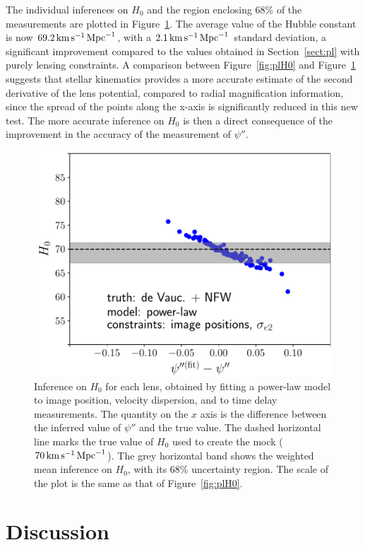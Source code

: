 \documentclass[usenatbib]{mnras}
\def\psiii{\psi''}
\def\Hunit{\,\rm{km}\,{s}^{-1}\,\rm{Mpc}^{-1}}
\def\Sref#1{Section~\ref{#1}\xspace}
\def\Fref#1{Figure~\ref{#1}\xspace}
\begin{document}
The individual inferences on $H_0$ and the region enclosing 68\% of the measurements are plotted in \Fref{fig:pl_indH0_wdyn}.
The average value of the Hubble constant is now $69.2\Hunit$, with a $2.1\Hunit$ standard deviation, a significant improvement compared to the values obtained in \Sref{sect:pl} with purely lensing constraints.
A comparison between \Fref{fig:plH0} and \Fref{fig:pl_indH0_wdyn} suggests that stellar kinematics provides a more accurate estimate of the second derivative of the lens potential, compared to radial magnification information, since the spread of the points along the x-axis is significantly reduced in this new test.
The more accurate inference on $H_0$ is then a direct consequence of the improvement in the accuracy of the measurement of $\psiii$.
%
\begin{figure}
 \includegraphics[width=\columnwidth]{pl_impos_dyn_individual_H0.pdf}
 \caption{Inference on $H_0$ for each lens, obtained by fitting a power-law model to image position, velocity dispersion, and to time delay measurements.
The quantity on the $x$ axis is the difference between the inferred value of $\psiii$ and the true value. The dashed horizontal line marks the true value of $H_0$ used to create the mock ($70\,\rm{km}\,\rm{s}^{-1}\,\rm{Mpc}^{-1}$).
The grey horizontal band shows the weighted mean inference on $H_0$, with its 68\% uncertainty region.
The scale of the plot is the same as that of \Fref{fig:plH0}.}
 \label{fig:pl_indH0_wdyn}
\end{figure}
%
\section{Discussion}\label{sect:discuss}
\end{document}
